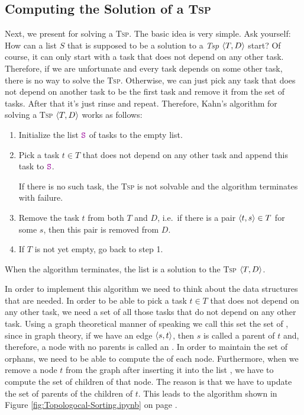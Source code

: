 \subsection{Computing the Solution of a \textsc{Tsp}}
Next, we present  \cite{kahn:1962} for solving a \textsc{Tsp}.
The basic idea is very simple. Ask yourself:  How can a list $S$ that is supposed to be a solution to a
\textsl{Tsp} $\pair(T, D)$ start? 
Of course, it can only start with a task that does not depend on any other task.  Therefore, if we are
unfortunate and every task depends on some other task, there is no way to solve the \textsc{Tsp}.  Otherwise,
we can just pick any task that does not depend on another task to be the first task and remove it from the set
of tasks.  After that it's just rinse and repeat.  Therefore, Kahn's algorithm for solving a \textsc{Tsp}
$\pair(T, D)$ works as follows: 
\begin{enumerate}
\item Initialize the list $\mytt{S}$ of tasks to the empty list.
\item Pick a task $t \in T$ that does not depend on any other task and append this task to $\mytt{S}$.

      If there is no such task, the \textsc{Tsp} is not solvable and the algorithm terminates with failure.
\item Remove the task $t$ from both $T$ and $D$, i.e.~if there is a pair $\pair(t, s) \in T$ for some $s$, then
      this pair is removed from $D$.
\item If $T$ is not yet empty, go back to step 1.  
\end{enumerate}
When the algorithm terminates, the list  is a solution to the \textsc{Tsp} $\pair(T, D)$.

In order to implement this algorithm we need to think about the data structures that are needed.
In order to be able to pick a task $t \in T$ that does not depend on any other task, we need a set of all those
tasks that do not depend on any other task.  Using a graph theoretical manner of speaking we call this set the
set of , since in graph theory, if we have an edge $\pair(s, t)$, then $s$ is called a parent of
$t$ and, therefore, a node with no parents is called an .  In order to maintain the set of
orphans, we need to be able to compute the  of each node.  Furthermore, when we remove a node $t$
from the graph after inserting it into the list , we have to compute the set of children of that
node.  The reason is that we have to update the set of parents of the children of $t$.  This leads to the algorithm
shown in Figure \ref{fig:Topologocal-Sorting.ipynb} on page \pageref{fig:Topologocal-Sorting.ipynb}.

